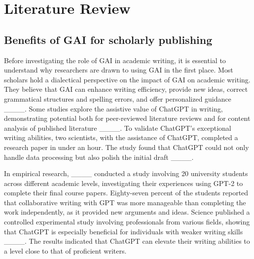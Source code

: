 \section{Literature Review}
\subsection{Benefits of GAI for scholarly publishing}
Before investigating the role of GAI in academic writing, it is essential to understand why researchers are drawn to using GAI in the first place. Most scholars hold a dialectical perspective on the impact of GAI on academic writing. They believe that GAI can enhance writing efficiency, provide new ideas, correct grammatical structures and spelling errors, and offer personalized guidance ____. Some studies explore the assistive value of ChatGPT in writing, demonstrating potential both for peer-reviewed literature reviews and for content analysis of published literature ____. To validate ChatGPT's exceptional writing abilities, two scientists, with the assistance of ChatGPT, completed a research paper in under an hour. The study found that ChatGPT could not only handle data processing but also polish the initial draft ____.

In empirical research, ____ conducted a study involving 20 university students across different academic levels, investigating their experiences using GPT-2 to complete their final course papers. Eighty-seven percent of the students reported that collaborative writing with GPT was more manageable than completing the work independently, as it provided new arguments and ideas. Science published a controlled experimental study involving professionals from various fields, showing that ChatGPT is especially beneficial for individuals with weaker writing skills ____. The results indicated that ChatGPT can elevate their writing abilities to a level close to that of proficient writers.

